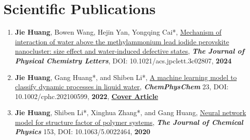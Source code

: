 \documentclass[a4paper,10pt]{article} %
\begin{document}
%	
%
\section{Scientific Publications}  

\begin{enumerate}
\item \textbf{Jie Huang}, Bowen Wang, Hejin Yan, Yongqing Cai*, \href{https://doi.org/10.1021/acs.jpclett.3c02807}{Mechanism of interaction of water above the methylammonium lead iodide perovskite nanocluster: size effect and water-induced defective states},   \textbf{\emph{The Journal of Physical Chemistry Letters}}, DOI: 10.1021/acs.jpclett.3c02807,  \textbf{2024}


\item \textbf{Jie Huang}, Gang Huang*, and Shiben Li*, \href{https://chemistry-europe.onlinelibrary.wiley.com/doi/abs/10.1002/cphc.202100599}{A machine learning model to classify dynamic processes in liquid water},   \textbf{\emph{ChemPhysChem}} 23, DOI: 10.1002/cphc.202100599,  \textbf{2022}, \href{https://cdn.jsdelivr.net/gh/HuangJiaLian/DataBase0@master/uPic/2022_01_05_16_CoverProfile.pdf}{\textbf{Cover Article}}


\item \textbf{Jie Huang}, Shiben Li*, Xinghua Zhang*, and Gang Huang, \href{https://aip.scitation.org/doi/10.1063/5.0022464}{Neural network model for structure factor of polymer systems},  \textbf{\emph{The Journal of Chemical Physics}} 153, DOI: 10.1063/5.0022464, \textbf{2020}
\end{enumerate}
\ 
\end{document}
